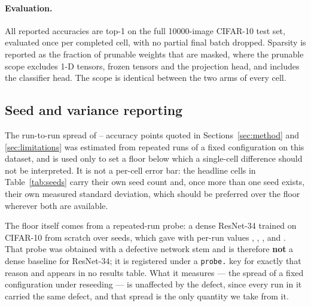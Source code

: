 \paragraph{Evaluation.}
All reported accuracies are top-1 on the full \num{10000}-image CIFAR-10 test
set, evaluated once per completed cell, with no partial final batch dropped.
Sparsity is reported as the fraction of prunable weights that are masked, where
the prunable scope excludes 1-D tensors, frozen tensors and the projection head,
and includes the classifier head. The scope is identical between the two arms of
every cell.

\subsection{Seed and variance reporting}

The run-to-run spread of
-- accuracy points
quoted in Sections~\ref{sec:method} and \ref{sec:limitations} was estimated from
repeated runs of a fixed configuration on this dataset, and is used only to set a
floor below which a single-cell difference should not be interpreted. It is not a
per-cell error bar: the headline cells in Table~\ref{tab:seeds} carry their own
seed count and, once more than one seed exists, their own measured standard
deviation, which should be preferred over the floor wherever both are
available.

The floor itself comes from a repeated-run probe: a dense ResNet-34 trained on
CIFAR-10 from scratch over  seeds, which
gave  with per-run values
,
,
,
 and
. That probe was obtained with a
defective network stem and is therefore \textbf{not} a dense baseline for
ResNet-34; it is registered under a \texttt{probe.} key for exactly that reason
and appears in no results table. What it measures --- the spread of a fixed
configuration under reseeding --- is unaffected by the defect, since every run in
it carried the same defect, and that spread is the only quantity we take from it.
